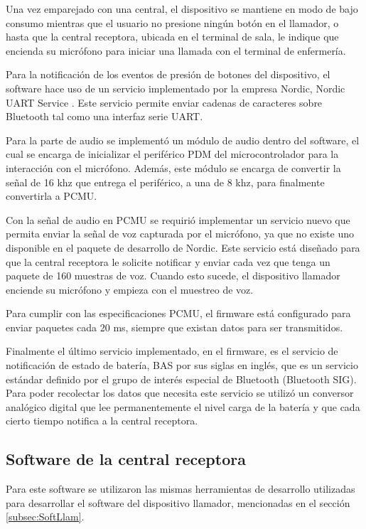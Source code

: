 Una vez emparejado con una central, el dispositivo se mantiene en modo de bajo consumo mientras que el usuario no presione ningún botón en el llamador, o hasta que la central receptora, ubicada en el terminal de sala, le indique que encienda su micrófono para iniciar una llamada con el terminal de enfermería.

Para la notificación de los eventos de presión de botones del dispositivo, el software hace uso de un servicio implementado por la empresa Nordic, Nordic UART Service \citep{NUS}. Este servicio permite enviar cadenas de caracteres sobre Bluetooth tal como una interfaz serie UART.

Para la parte de audio se implementó un módulo de audio dentro del software, el cual se encarga de inicializar el periférico PDM del microcontrolador para la interacción con el micrófono. Además, este módulo se encarga de convertir la señal de 16 khz que entrega el periférico, a una de 8 khz,  para finalmente convertirla a PCMU.

Con la señal de audio en PCMU se requirió implementar un servicio nuevo que permita enviar la señal de voz capturada por el micrófono, ya que no existe uno disponible en el paquete de desarrollo de Nordic. Este servicio está diseñado para que la central receptora le solicite notificar y enviar cada vez que tenga un paquete de 160 muestras de voz. Cuando esto sucede, el dispositivo llamador enciende su micrófono y empieza con el muestreo de voz.

Para cumplir con las especificaciones PCMU, el firmware está configurado para enviar paquetes cada 20 ms, siempre que existan datos para ser transmitidos.

Finalmente el último servicio implementado, en el firmware, es el servicio de notificación de estado de batería, BAS por sus siglas en inglés, que es un servicio estándar definido por el grupo de interés especial de Bluetooth (Bluetooth SIG). Para poder recolectar los datos que necesita este servicio se utilizó un conversor analógico digital que lee permanentemente el nivel carga de la batería y que cada cierto tiempo notifica a la central receptora.

\subsection{Software de la central receptora}
\label{subsec:SoftCentral}

Para este software se utilizaron las mismas herramientas de desarrollo utilizadas para desarrollar el software del dispositivo llamador, mencionadas en el sección \ref{subsec:SoftLlam}.

